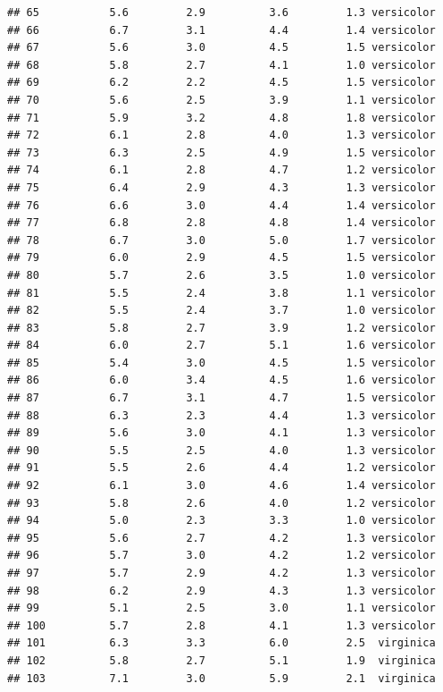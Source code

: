 \documentclass[
]{article}
\begin{document}
\begin{verbatim}
## 65           5.6         2.9          3.6         1.3 versicolor
## 66           6.7         3.1          4.4         1.4 versicolor
## 67           5.6         3.0          4.5         1.5 versicolor
## 68           5.8         2.7          4.1         1.0 versicolor
## 69           6.2         2.2          4.5         1.5 versicolor
## 70           5.6         2.5          3.9         1.1 versicolor
## 71           5.9         3.2          4.8         1.8 versicolor
## 72           6.1         2.8          4.0         1.3 versicolor
## 73           6.3         2.5          4.9         1.5 versicolor
## 74           6.1         2.8          4.7         1.2 versicolor
## 75           6.4         2.9          4.3         1.3 versicolor
## 76           6.6         3.0          4.4         1.4 versicolor
## 77           6.8         2.8          4.8         1.4 versicolor
## 78           6.7         3.0          5.0         1.7 versicolor
## 79           6.0         2.9          4.5         1.5 versicolor
## 80           5.7         2.6          3.5         1.0 versicolor
## 81           5.5         2.4          3.8         1.1 versicolor
## 82           5.5         2.4          3.7         1.0 versicolor
## 83           5.8         2.7          3.9         1.2 versicolor
## 84           6.0         2.7          5.1         1.6 versicolor
## 85           5.4         3.0          4.5         1.5 versicolor
## 86           6.0         3.4          4.5         1.6 versicolor
## 87           6.7         3.1          4.7         1.5 versicolor
## 88           6.3         2.3          4.4         1.3 versicolor
## 89           5.6         3.0          4.1         1.3 versicolor
## 90           5.5         2.5          4.0         1.3 versicolor
## 91           5.5         2.6          4.4         1.2 versicolor
## 92           6.1         3.0          4.6         1.4 versicolor
## 93           5.8         2.6          4.0         1.2 versicolor
## 94           5.0         2.3          3.3         1.0 versicolor
## 95           5.6         2.7          4.2         1.3 versicolor
## 96           5.7         3.0          4.2         1.2 versicolor
## 97           5.7         2.9          4.2         1.3 versicolor
## 98           6.2         2.9          4.3         1.3 versicolor
## 99           5.1         2.5          3.0         1.1 versicolor
## 100          5.7         2.8          4.1         1.3 versicolor
## 101          6.3         3.3          6.0         2.5  virginica
## 102          5.8         2.7          5.1         1.9  virginica
## 103          7.1         3.0          5.9         2.1  virginica

\end{verbatim}
\end{document}
